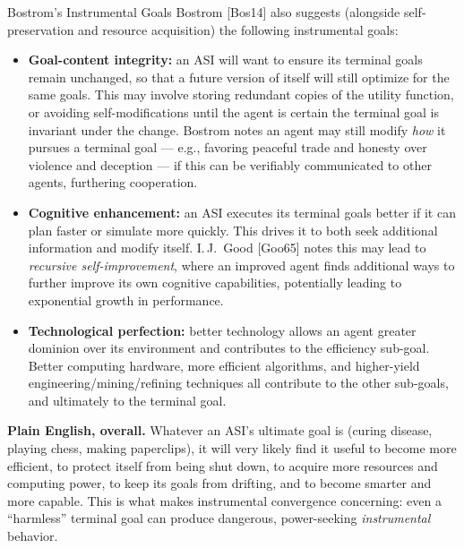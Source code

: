 \documentclass[aspectratio=169,10pt]{beamer}
\begin{document}
\begin{frame}[allowframebreaks]{Bostrom's Instrumental Goals}
  Bostrom [Bos14] also suggests (alongside self-preservation and resource
  acquisition) the following instrumental goals:

  \begin{itemize}
    \item \textbf{Goal-content integrity:} an ASI will want to ensure its
      terminal goals remain unchanged, so that a future version of itself
      will still optimize for the same goals. This may involve storing
      redundant copies of the utility function, or avoiding
      self-modifications until the agent is certain the terminal goal is
      invariant under the change. Bostrom notes an agent may still modify
      \emph{how} it pursues a terminal goal --- e.g., favoring peaceful
      trade and honesty over violence and deception --- if this can be
      verifiably communicated to other agents, furthering cooperation.
    \item \textbf{Cognitive enhancement:} an ASI executes its terminal
      goals better if it can plan faster or simulate more quickly. This
      drives it to both seek additional information and modify itself.
      I.\,J.\ Good [Goo65] notes this may lead to \emph{recursive
      self-improvement}, where an improved agent finds additional ways to
      further improve its own cognitive capabilities, potentially leading
      to exponential growth in performance.

    \framebreak

    \item \textbf{Technological perfection:} better technology allows an
      agent greater dominion over its environment and contributes to the
      efficiency sub-goal. Better computing hardware, more efficient
      algorithms, and higher-yield engineering/mining/refining techniques
      all contribute to the other sub-goals, and ultimately to the
      terminal goal.
  \end{itemize}

  \textbf{Plain English, overall.} Whatever an ASI's ultimate goal is
  (curing disease, playing chess, making paperclips), it will very likely
  find it useful to become more efficient, to protect itself from being
  shut down, to acquire more resources and computing power, to keep its
  goals from drifting, and to become smarter and more capable. This is
  what makes instrumental convergence concerning: even a ``harmless''
  terminal goal can produce dangerous, power-seeking \emph{instrumental}
  behavior.
\end{frame}
\end{document}

